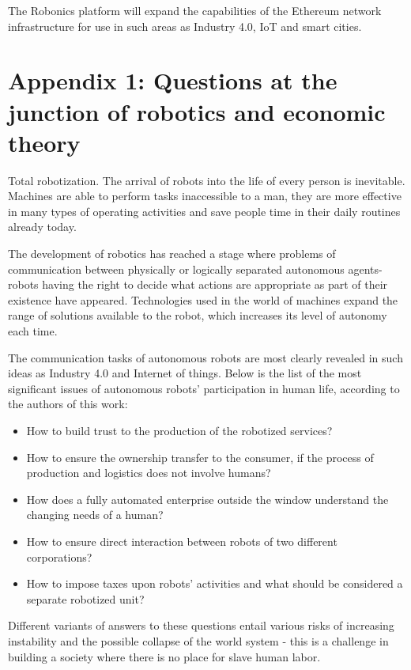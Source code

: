 \documentclass{article}
\begin{document}
The Robonics platform will expand the capabilities of the Ethereum network infrastructure for use in such areas as Industry 4.0, IoT and smart cities.
\newpage
\printbibliography
\newpage
\section*{Appendix 1: Questions at the junction of robotics and economic theory}

Total robotization. The arrival of robots into the life of every person is inevitable. Machines are able to perform tasks inaccessible to a man, they are more effective in many types of operating activities and save people time in their daily routines already today.

The development of robotics has reached a stage where problems of communication between physically or logically separated autonomous agents-robots having the right to decide what actions are appropriate as part of their existence have appeared. Technologies used in the world of machines expand the range of solutions available to the robot, which increases its level of autonomy each time.   

The communication tasks of autonomous robots are most clearly revealed in such ideas as Industry 4.0 and Internet of things. Below is the list of the most significant issues of autonomous robots' participation in human life, according to the authors of this work:

\begin{itemize}
	\item How to build trust to the production of the robotized services?
	\item How to ensure the ownership transfer to the consumer, if the process of production and logistics does not involve humans?  
	\item How does a fully automated enterprise outside the window understand the changing needs of a human?
	\item How to ensure direct interaction between robots of two different corporations?
	\item How to impose taxes upon robots' activities and what should be considered a separate robotized unit?
\end{itemize}

Different variants of answers to these questions entail various risks of increasing instability and the possible collapse of the world system - this is a challenge in building a society where there is no place for slave human labor.
\end{document}
